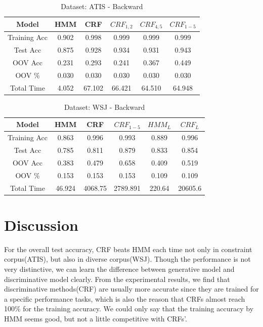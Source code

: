 \documentclass[journal, a4paper]{IEEEtran}
\begin{document}
	\begin{table}[!hbt]
		\begin{center}
		\caption{Dataset: ATIS - Backward}
		\label{tab:3}
		\begin{tabular}{|c|c|c|c|c|c|}
			\hline
			Model & HMM & CRF & $CRF_{1,2}$ & $CRF_{4,5}$ & $CRF_{1-5}$\\ \hline
			 Training Acc & 0.902 & 0.998 & 0.999 & 0.999 & 0.999 \\ \hline
			 Test Acc  & 0.875 &  0.928 & 0.934 & 0.931 & 0.943\\ \hline
			OOV Acc & 0.231 & 0.293 & 0.241 & 0.367 & 0.449 \\ \hline
				OOV \% & 0.030 & 0.030 & 0.030 & 0.030 & 0.030\\\hline
			 Total Time & 4.052 & 67.102 & 66.421 & 64.510 & 64.948  \\ 
			 \hline
		\end{tabular}
		\end{center}
		\vspace{-5mm}
	\end{table}
	
	\begin{table}[!hbt]
		\begin{center}
		\caption{Dataset: WSJ - Backward}
		\label{tab:4}
		\begin{tabular}{|c|c|c|c|c|c|}
			\hline
			Model & HMM & CRF & $CRF_{1-5}$ & $HMM_{L}$ & $CRF_{L}$\\ \hline
			 Training Acc & 0.863 & 0.996 & 0.993 & 0.889 & 0.996 \\ \hline
			 Test Acc  & 0.785 & 0.811 & 0.879 & 0.833 & 0.854\\ \hline
			OOV Acc & 0.383 & 0.479 & 0.658 & 0.409 & 0.519\\ \hline
			OOV \% & 0.153 & 0.153 & 0.153 & 0.109 & 0.109\\\hline
			 Total Time & 46.924 & 4068.75 & 2789.891 & 220.64 & 20605.6 \\ 
			 \hline
		\end{tabular}
		\end{center}
		\vspace{-5mm}
	\end{table}

\section{Discussion}\label{discuss}
For the overall test accuracy, CRF beats HMM each time not only in constraint corpus(ATIS), but also in diverse corpus(WSJ). Though the performance is not very distinctive, we can learn the difference between generative model and discriminative model clearly. From the experimental results, we find that discriminative methods(CRF) are usually more accurate since they are trained for a specific performance tasks, which is also the reason that CRFs almost reach 100\% for the training accuracy.  We could only say that the training accuracy by HMM seems good, but not a little competitive with CRFs'.
\end{document}
